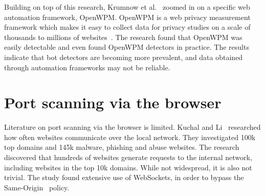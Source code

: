 Building on top of this research, Krumnow et al.~\cite{krumnow2022} zoomed in on a specific web automation framework, OpenWPM. OpenWPM is a web privacy measurement framework which makes it easy to collect data for privacy studies on a scale of thousands to millions of websites~\cite{openwpm_github}. The research found that OpenWPM was easily detectable and even found OpenWPM detectors in practice. The results indicate that bot detectors are becoming more prevalent, and data obtained through automation frameworks may not be reliable.





\section{Port scanning via the browser}

Literature on port scanning via the browser is limited. Kuchal and Li~\cite{kuchhal2021} researched how often websites communicate over the local network. They investigated 100k top domains and 145k malware, phishing and abuse websites. The research discovered that hundreds of websites generate requests to the internal network, including websites in the top 10k domains. While not widespread, it is also not trivial. The study found extensive use of WebSockets, in order to bypass the Same-Origin~\cite{w3c_same_origin_policy} policy.


